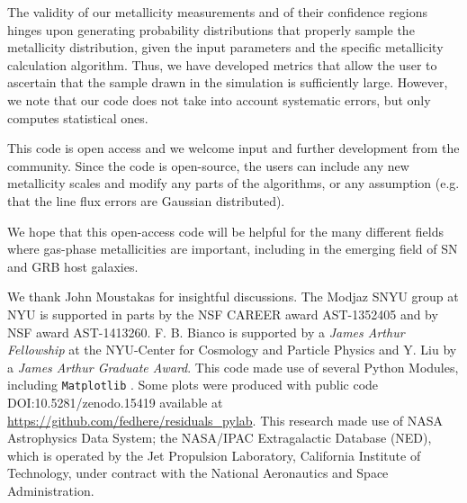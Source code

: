 \documentclass{emulateapj}
\begin{document}
The validity of our metallicity measurements and of their confidence regions hinges upon generating probability distributions that properly sample the metallicity distribution, given the input parameters and the specific metallicity calculation algorithm. Thus, we have developed metrics that allow the user to ascertain that the sample drawn in the simulation is sufficiently large. However, we note that our code does not take into account systematic errors, but only computes statistical ones.

This code is open access and we welcome input and further development from the community.
Since the code is open-source, the users can include any new metallicity scales and modify any parts of the algorithms, or any assumption (e.g. that the line flux errors are Gaussian distributed). 

We hope that this open-access code will be helpful for the many different fields where gas-phase metallicities are important, including in the emerging field of SN and GRB host galaxies.


\acknowledgements
We thank John Moustakas for insightful discussions. The Modjaz SNYU group at NYU is supported in parts by the NSF CAREER award AST-1352405 and by NSF award AST-1413260. F. B. Bianco is supported by a \emph{James Arthur Fellowship} at the NYU-Center for Cosmology and Particle Physics and Y. Liu by a \emph{James Arthur Graduate Award}.
This code made use of  several Python Modules, including \verb=Matplotlib= .
Some plots were  produced with public code DOI:10.5281/zenodo.15419 available at \url{https://github.com/fedhere/residuals_pylab}.
This research made use of NASA Astrophysics Data
System; the NASA/IPAC Extragalactic Database (NED), which
is operated by the Jet Propulsion Laboratory, California Institute
of Technology, under contract with the National Aeronautics
and Space Administration.






\end{document}
